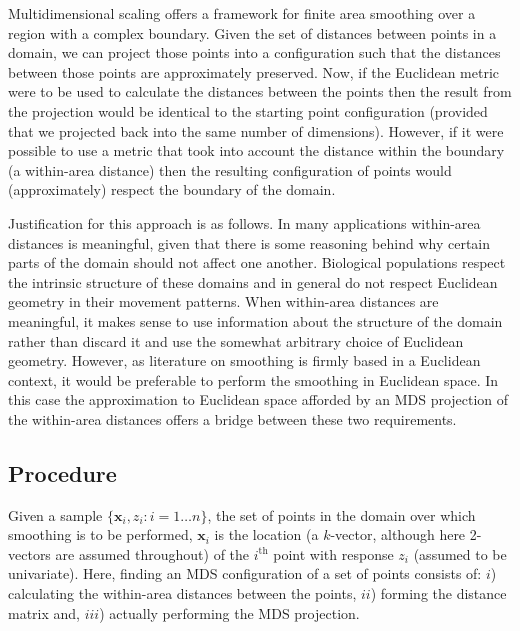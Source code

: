 Multidimensional scaling offers a framework for finite area smoothing over a region with a complex boundary. Given the set of distances between points in a domain, we can project those points into a configuration such that the distances between those points are approximately preserved. Now, if the Euclidean metric were to be used to calculate the distances between the points then the result from the projection would be identical to the starting point configuration (provided that we projected back into the same number of dimensions). However, if it were possible to use a metric that took into account the distance within the boundary (a within-area distance) then the resulting configuration of points would (approximately) respect the boundary of the domain.

Justification for this approach is as follows. In many applications within-area distances is meaningful, given that there is some reasoning behind why certain parts of the domain should not affect one another. Biological populations respect the intrinsic structure of these domains and in general do not respect Euclidean geometry in their movement patterns. When within-area distances are meaningful, it makes sense to use information about the structure of the domain rather than discard it and use the somewhat arbitrary choice of Euclidean geometry. However, as literature on smoothing is firmly based in a Euclidean context, it would be preferable to perform the smoothing in Euclidean space. In this case the approximation to Euclidean space afforded by an MDS projection of the within-area distances offers a bridge between these two requirements.

\subsection{Procedure}
\label{mdsproc}
Given a sample $\{\mathbf{x}_i, z_i : i=1\dots n\}$, the set of points in the domain over which smoothing is to be performed, $\mathbf{x}_i$ is the location (a $k$-vector, although here 2-vectors are assumed throughout) of the $i^\text{th}$ point with response $z_i$ (assumed to be univariate). Here, finding an MDS configuration of a set of points consists of: $i$) calculating the within-area distances between the points, $ii$) forming the distance matrix and, $iii$) actually performing the MDS projection.

